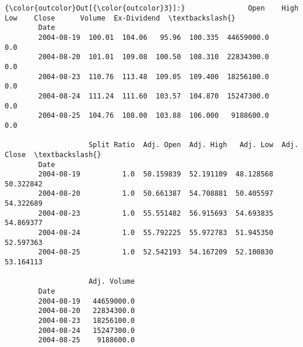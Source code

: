 \documentclass[11pt]{article}
\begin{document}
\begin{Verbatim}[commandchars=\\\{\}]
{\color{outcolor}Out[{\color{outcolor}3}]:}               Open    High     Low    Close      Volume  Ex-Dividend  \textbackslash{}
        Date                                                                   
        2004-08-19  100.01  104.06   95.96  100.335  44659000.0          0.0   
        2004-08-20  101.01  109.08  100.50  108.310  22834300.0          0.0   
        2004-08-23  110.76  113.48  109.05  109.400  18256100.0          0.0   
        2004-08-24  111.24  111.60  103.57  104.870  15247300.0          0.0   
        2004-08-25  104.76  108.00  103.88  106.000   9188600.0          0.0   
        
                    Split Ratio  Adj. Open  Adj. High   Adj. Low  Adj. Close  \textbackslash{}
        Date                                                                   
        2004-08-19          1.0  50.159839  52.191109  48.128568   50.322842   
        2004-08-20          1.0  50.661387  54.708881  50.405597   54.322689   
        2004-08-23          1.0  55.551482  56.915693  54.693835   54.869377   
        2004-08-24          1.0  55.792225  55.972783  51.945350   52.597363   
        2004-08-25          1.0  52.542193  54.167209  52.100830   53.164113   
        
                    Adj. Volume  
        Date                     
        2004-08-19   44659000.0  
        2004-08-20   22834300.0  
        2004-08-23   18256100.0  
        2004-08-24   15247300.0  
        2004-08-25    9188600.0  
\end{Verbatim}
            
\end{document}

